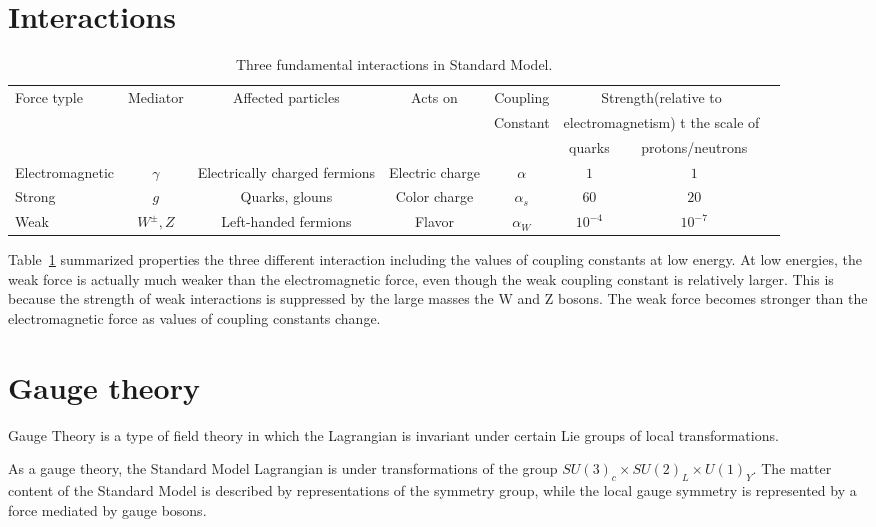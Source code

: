  

\section{Interactions}
\begin{table}[tbh]
\centering
\tiny
\begin{tabular}{|l|c|c|c|c|c|c|c}

\hline
    Force typle & Mediator & Affected particles & Acts on & Coupling&  \multicolumn{2}{c|}{Strength(relative to }\\
    &&&&Constant &\multicolumn{2}{c|}{electromagnetism) t the scale of}\\ 
    \hline
   &&&&&quarks& protons/neutrons \\
\hline
\hline
    Electromagnetic & $\gamma$&Electrically charged fermions&Electric charge& $\alpha$ &$1$&$1$\\
    Strong  & $g$ &Quarks, glouns & Color charge& $\alpha_s$ &$60$&$20$\\
    Weak & $W^{\pm}, Z$ &Left-handed fermions & Flavor& $\alpha_W$ &$10^{-4}$&$10^{-7}$\\
\hline

\end{tabular}
\caption{Three fundamental interactions in Standard Model. }
\label{tab:forces}
\end{table}

\par Table~\ref{tab:forces} summarized properties the three different interaction including the values of coupling constants at low energy. 
At low energies, the weak force is actually much weaker than the electromagnetic force, even though the weak coupling constant is relatively larger. 
This is because the strength of weak interactions is suppressed by the large masses the W and Z bosons. The weak force becomes stronger than the electromagnetic force as values of coupling constants change.

\section{Gauge theory}
\par Gauge Theory is a type of field theory in which the Lagrangian is invariant under certain Lie groups of local transformations.
\par As a gauge theory, the Standard Model Lagrangian is under transformations of the group $SU(3)_c \times SU(2)_L \times U(1)_Y$. The matter content of the Standard Model is described by representations of the symmetry group, while the local gauge symmetry is represented by a force mediated by gauge bosons.

